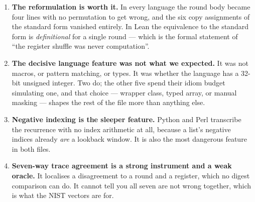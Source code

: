 \documentclass[11pt,a4paper]{article}
\begin{document}
\begin{enumerate}[leftmargin=1.5em]
\item \textbf{The reformulation is worth it.} In every language the round body
  became four lines with no permutation to get wrong, and the six copy
  assignments of the standard form vanished entirely. In Lean the equivalence
  to the standard form is \emph{definitional} for a single round --- which is
  the formal statement of ``the register shuffle was never computation''.
\item \textbf{The decisive language feature was not what we expected.} It was
  not macros, or pattern matching, or types. It was whether the language has a
  32-bit unsigned integer. Two do; the other five spend their idiom budget
  simulating one, and that choice --- wrapper class, typed array, or manual
  masking --- shapes the rest of the file more than anything else.
\item \textbf{Negative indexing is the sleeper feature.} Python and Perl
  transcribe the recurrence with no index arithmetic at all, because a list's
  negative indices already \emph{are} a lookback window. It is also the most
  dangerous feature in both files.
\item \textbf{Seven-way trace agreement is a strong instrument and a weak
  oracle.} It localises a disagreement to a round and a register, which no
  digest comparison can do. It cannot tell you all seven are not wrong
  together, which is what the NIST vectors are for.
\end{enumerate}

\printbibliography[heading=bibintoc]
\end{document}
